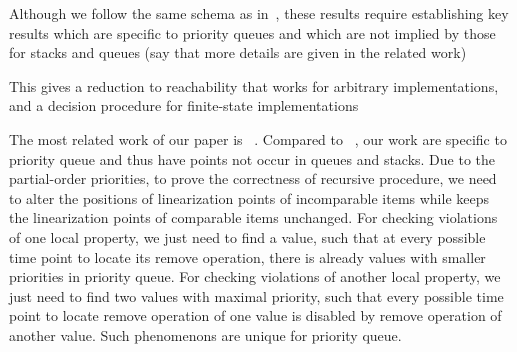 Although we follow the same schema as in~\cite{DBLP:conf/icalp/BouajjaniEEH15}, these results require establishing key results which are specific to priority queues and which are not implied by those for stacks and queues (say that more details are given in the related work)

This gives a reduction to reachability that works for arbitrary implementations, and a decision procedure for finite-state implementations




\smallskip

\noindent The most related work of our paper is ~\cite{DBLP:conf/icalp/BouajjaniEEH15}. Compared to ~\cite{DBLP:conf/icalp/BouajjaniEEH15}, our work are specific to priority queue and thus have points not occur in queues and stacks. Due to the partial-order priorities, to prove the correctness of recursive procedure, we need to alter the positions of linearization points of incomparable items while keeps the linearization points of comparable items unchanged. For checking violations of one local property, we just need to find a value, such that at every possible time point to locate its remove operation, there is already values with smaller priorities in priority queue. For checking violations of another local property, we just need to find two values with maximal priority, such that every possible time point to locate remove operation of one value is disabled by remove operation of another value. Such phenomenons are unique for priority queue. 



